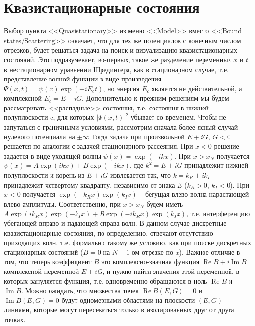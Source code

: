 \documentclass[12pt]{article}
\renewcommand{\Re}{\mathop{\mathrm{Re}}\nolimits}
\renewcommand{\Im}{\mathop{\mathrm{Im}}\nolimits}
\begin{document}
\hypertarget{U_quasi}{}\section{Квазистационарные состояния}
Выбор пункта <<Quasistationary>> из меню <<Model>> вместо <<Bound states/Scatte\-ring>> означает, что для тех же
потенциалов с конечным числом отрезков, будет решаться задача на поиск и визуализацию квазистационарных
состояний. Это подразумевает, во-первых, такое же разделение переменных $x$ и $t$ в нестационарном
уравнении Шредингера, как в стационарном случае, т.е. представление волной функции в виде произведения
$\Psi(x,t)= \psi(x)\exp(-iE_ct)$, но энергия $E_c$ является не действительной, а комплексной $E_c=E+iG$.
Дополнительно к прежним решениям мы будем рассматривать <<распадные>> состояния, т.е. состояния в
нижней полуплоскости e, для которых $|\Psi(x,t)|^2$ убывает со временем. Чтобы не запутаться с
граничными условиями, рассмотрим сначала более ясный случай нулевого потенциала на $\pm\infty$ %
Тогда задача при произвольной $E+iG$, $G<0$ решается по аналогии с задачей стационарного рассеяния.
При $x<0$ решение задается в виде уходящей волны $\psi(x)= \exp(-ikx)$. При $x>x_N$ получается
$\psi(x)=A\exp(ikx)+B\exp(-ikx)$, где $k^2=E+iG$ принадлежит нижней полуплоскости и корень из $E+iG$
извлекается так, что  $k=k_R+ik_I$ принадлежит четвертому квадранту, независимо от знака $E$ ($k_R >0$, $k_I<0$).
При $x<0$ получается $\exp(-k_R x)\exp(k_I x)$ -- бегущая влево волна нарастающей влево амплитуды.
Соответственно, при $x>x_N$ будем иметь $A\exp(i k_R x)\exp(-k_I x)+B\exp(-i k_R x)\exp(k_I x)$,
т.е. интерференцию убегающей вправо и падающей справа волн. В данном случае дискретные квазистационарные
состояния, по определению, отвечают отсутствию приходящих волн, т.е. формально такому же условию,
как при поиске дискретных стационарных состояний ($B=0$ на $N+1$-ом отрезке по $x$).
Важное отличие в том, что теперь коэффициент $B$ это комплексно-значная функция $\Re B+i\Im B$ комплексной переменной
$E+iG$, и нужно найти значения этой переменной, в которых зануляется функция, т.е. одновременно
обращаются в ноль $\Re B$ и $\Im B$. Можно ожидать, что множества точек $\Re B(E,G)=0$ и $\Im B(E,G)=0$ будут
одномерными областями на плоскости $(E,G)$ --- линиями, которые могут пересекаться только в изолированных друг от друга точках.
\end{document}

